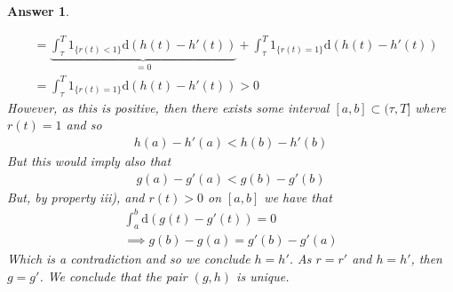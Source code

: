 \documentclass[12pt]{article}
\theoremstyle{colon}
\newtheorem*{answer}{Answer}
\begin{document}
\begin{answer}
\begin{enumerate}[label=\roman*)]
\begin{align*}
        &= \underbrace{ \int_\tau^T 1_{\{r(t) < 1\}} \text{d}(h(t) - h'(t)) }_{= 0} + \int_\tau^T 1_{\{r(t) = 1\}} \text{d}(h(t) - h'(t)) \\
        &= \int_\tau^T 1_{\{r(t) = 1\}} \text{d}(h(t) - h'(t)) > 0
      \end{align*}
      However, as this is positive, then there exists some interval $[a,b] \subset (\tau, T]$ where $r(t) = 1$ and so
      \begin{gather*}
        h(a) - h'(a) < h(b) - h'(b)
      \end{gather*}
      But this would imply also that
      \begin{gather*}
        g(a) - g'(a) < g(b) - g'(b)
      \end{gather*}
      But, by property iii), and $r(t) > 0$ on $[a,b]$ we have that
      \begin{gather*}
        \int_a^b \text{d} (g(t) - g'(t)) = 0 \\
        \implies g(b) - g(a) = g'(b) - g'(a)
      \end{gather*}
      Which is a contradiction and so we conclude $h = h'$. As $r = r'$ and $h = h'$, then $g = g'$. We conclude that the pair $(g,h)$ is unique.
  \end{enumerate}
\end{answer}
\end{document}
